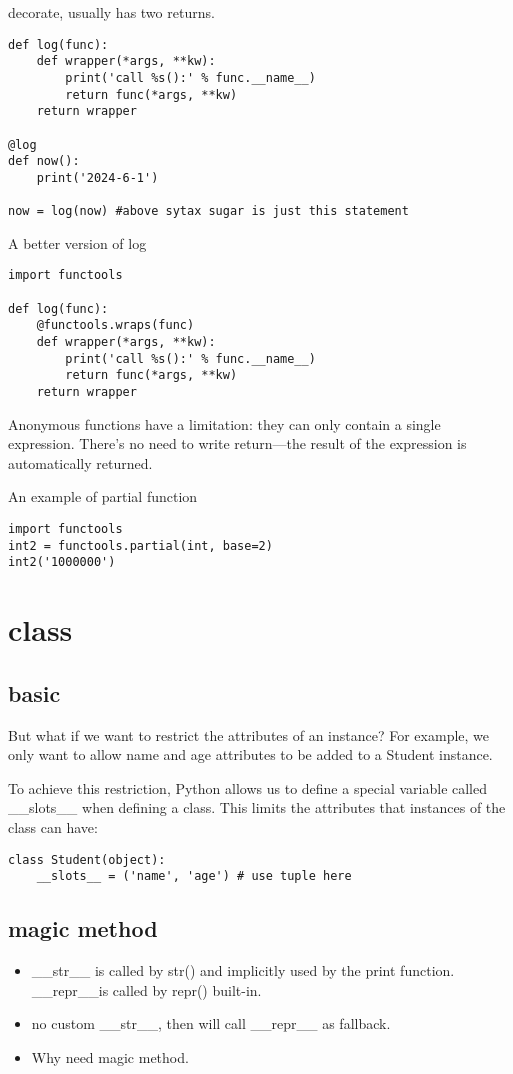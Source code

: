 \documentclass[a4paper,12pt,twoside]{book}
\begin{document}
decorate, usually has two returns. 
\begin{lstlisting}
def log(func):
	def wrapper(*args, **kw):
		print('call %s():' % func.__name__)
		return func(*args, **kw)
	return wrapper
	
@log
def now():
	print('2024-6-1')
	
now = log(now) #above sytax sugar is just this statement
\end{lstlisting}

	A better version of log
\begin{lstlisting}
import functools

def log(func):
	@functools.wraps(func)
	def wrapper(*args, **kw):
		print('call %s():' % func.__name__)
		return func(*args, **kw)
	return wrapper
\end{lstlisting}

	Anonymous functions have a limitation: they can only contain a single expression. There's no need to write return—the result of the expression is automatically returned.
	
	An example of partial function
\begin{lstlisting}
import functools
int2 = functools.partial(int, base=2)
int2('1000000')	
\end{lstlisting}

\chapter{class}
\section{basic}
\begin{itemize}
	
	But what if we want to restrict the attributes of an instance? For example, we only want to allow name and age attributes to be added to a Student instance.
	
	To achieve this restriction, Python allows us to define a special variable called \_\_slots\_\_ when defining a class. This limits the attributes that instances of the class can have:
\begin{lstlisting}
class Student(object):
	__slots__ = ('name', 'age') # use tuple here
\end{lstlisting}
	
\end{itemize}
\section{magic method}
\begin{itemize}
	\item \_\_str\_\_ is called by str() and implicitly used by the print function. \_\_repr\_\_is called by repr() built-in. 
	\item no custom \_\_str\_\_, then will call \_\_repr\_\_ as fallback. 
	\item Why need magic method. 
\end{itemize}
\end{document}
